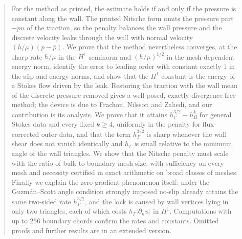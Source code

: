 \documentclass[11pt,reqno]{amsart}
\theoremstyle{plain}
\theoremstyle{definition}
\begin{document}
\begin{abstract}
For the method as printed, the estimate holds if and only if the pressure is constant along the wall. The printed Nitsche form omits the pressure part $-pn$ of the traction, so the penalty balances the wall pressure and the discrete velocity leaks through the wall with normal velocity $(h/\mu)(p-\bar p)$. We prove that the method nevertheless converges, at the sharp rate $h/\mu$ in the $H^1$ seminorm and $(h/\mu)^{1/2}$ in the mesh-dependent energy norm, identify the error to leading order with constant exactly $1$ in the slip and energy norms, and show that the $H^1$ constant is the energy of a Stokes flow driven by the leak. Restoring the traction with the wall mean of the discrete pressure removed gives a well-posed, exactly divergence-free method; the device is due to Frachon, Nilsson and Zahedi, and our contribution is its analysis. We prove that it attains $h_\Gamma^{3/2}+h_\Omega^k$ for general Stokes data and every fixed $k\ge4$, uniformly in the penalty for flux-corrected outer data, and that the term $h_\Gamma^{3/2}$ is sharp whenever the wall shear does not vanish identically and $h_\Gamma$ is small relative to the minimum angle of the wall triangles. We show that the Nitsche penalty must scale with the ratio of bulk to boundary mesh size, with sufficiency on every mesh and necessity certified in exact arithmetic on broad classes of meshes. Finally we explain the zero-gradient phenomenon itself: under the Guzm\'an--Scott angle condition strongly imposed no-slip already attains the same two-sided rate $h_\Gamma^{3/2}$, and the lock is caused by wall vertices lying in only two triangles, each of which costs $h_\Gamma|\partial_nu|$ in $H^1$. Computations with up to $256$ boundary chords confirm the rates and constants. Omitted proofs and further results are in an extended version.
\end{abstract}

\maketitle















\end{document}
